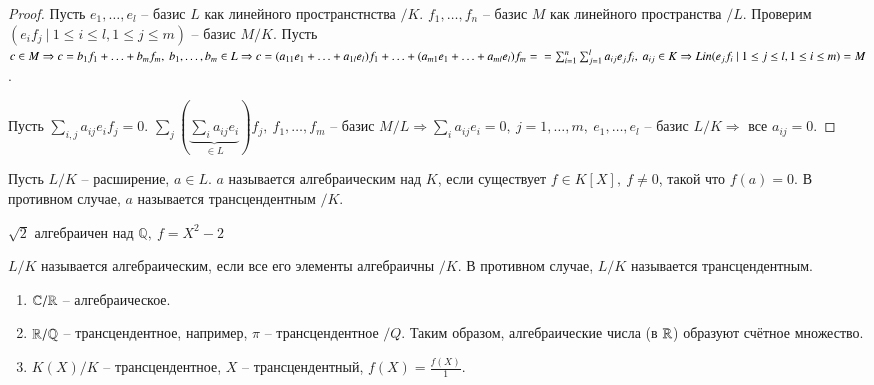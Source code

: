 \documentclass[main]{subfiles}
\begin{document}
\begin{proof}
    Пусть $e_1, \ldots , e_l $ -- базис $L$ как линейного пространстнства $/ K$.
    $f_1, \ldots , f_n$ -- базис $M$ как линейного пространства $/ L$. Проверим 
    $(e_i f_j \ | \ 1 \leq i \leq l, 1 \leq j \leq m)$ -- базис $M / K$. Пусть $c \in M
    \Rightarrow c = b_1f_1 + \ldots + b_mf_m, \ b_1, \ldots, b_m \in L \Rightarrow 
        c = (a_{11}e_1 + \ldots + a_{1l}e_l)f_1 + \ldots + (a_{m1}e_1 + \ldots + a_{ml}e_l)f_m = \\
        = \sum^n_{i=1} \sum^l_{j=1} a_{ij}e_jf_i, \ a_{ij} \in K 
        \Rightarrow Lin(e_jf_i \ | \ 1 \leq j \leq l, 1 \leq i \leq m) = M$.

        Пусть $\sum_{i,j} a_{ij} e_if_j = 0 $.
         $\sum_{j} \left( \underbrace{\sum_{i} a_{ij} e_i}_{\in L} \right) f_j, \ f_1, \ldots, f_m \text{ -- базис } M / L 
         \Rightarrow \sum_i a_{ij}  e_i = 0, \ j = 1, \ldots, m, \ e_1, \ldots, e_l$ -- базис $L / K
         \Rightarrow$ все $a_{ij} = 0$.
   
\end{proof}

\begin{definition}
    Пусть $L / K$ -- расширение, $a \in L$. $a$ называется алгебраическим
    над $K$, если существует $f \in K[X], \ f \ne 0$, такой что $f(a) = 0 $. В противном случае, $a$
    называется трансцендентным $/ K$.
\end{definition}

\begin{example}
    $\sqrt{2}$ алгебраичен над $\mathbb{Q}, \ f = X^2-2$
\end{example}

$L / K$ называется алгебраическим, если все его элементы алгебраичны $/ K$.
В противном случае, $L / K$ называется трансцендентным.

\begin{example}
    \begin{enumerate}
        \item $ \mathbb{C} / \mathbb{R} $ -- алгебраическое.
        \item $\mathbb{R} / \mathbb{Q}$ -- трансцендентное, например, $\pi$ -- трансцендентное $/ Q$.
        Таким образом, алгебраические числа (в $\mathbb{R}$) образуют счётное множество.
        \item  $K(X) / K$ -- трансцендентное,  $X$ -- трансцендентный, $f(X) = \frac{f(X)}{1}$.
    \end{enumerate}
\end{example}
\end{document}
